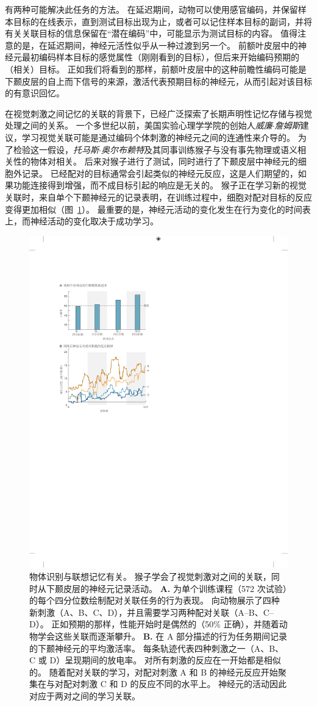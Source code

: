 有两种可能解决此任务的方法。
在延迟期间，动物可以使用感官编码，并保留样本目标的在线表示，直到测试目标出现为止，或者可以记住样本目标的副词，并将有关关联目标的信息保留在“潜在编码”中，可能显示为测试目标的内容。
值得注意的是，在延迟期间，神经元活性似乎从一种过渡到另一个。
前额叶皮层中的神经元最初编码样本目标的感觉属性（刚刚看到的目标），但后来开始编码预期的（相关）目标。
正如我们将看到的那样，前额叶皮层中的这种前瞻性编码可能是下颞皮层的自上而下信号的来源，激活代表预期目标的神经元，从而引起对该目标的有意识回忆。


在视觉刺激之间记忆的关联的背景下，已经广泛探索了长期声明性记忆存储与视觉处理之间的关系。
一个多世纪以前，美国实验心理学学院的创始人\textit{威廉$\cdot$詹姆斯}建议，学习视觉关联可能是通过编码个体刺激的神经元之间的连通性来介导的。
为了检验这一假设，\textit{托马斯$\cdot$奥尔布赖特}及其同事训练猴子与没有事先物理或语义相关性的物体对相关。
后来对猴子进行了测试，同时进行了下颞皮层中神经元的细胞外记录。
已经配对的目标通常会引起类似的神经元反应，这是人们期望的，如果功能连接得到增强，而不成目标引起的响应是无关的。
猴子正在学习新的视觉关联时，来自单个下颞神经元的记录表明，在训练过程中，细胞对配对目标的反应变得更加相似（图~\ref{fig:24_12}）。
最重要的是，神经元活动的变化发生在行为变化的时间表上，而神经活动的变化取决于成功学习。


\begin{figure}[htbp]
	\centering
	\includegraphics[width=0.65\linewidth]{chap24/fig_24_12}
	\caption{物体识别与联想记忆有关。
		猴子学会了视觉刺激对之间的关联，同时从下颞皮层的神经元记录活动。
		\textbf{A.} 为单个训练课程（572 次试验）的每个四分位数绘制配对关联任务的行为表现。
		向动物展示了四种新刺激（A、B、C、D），并且需要学习两种配对关联（A–B、C–D）。
		正如预期的那样，性能开始时是偶然的（50\% 正确），并随着动物学会这些关联而逐渐攀升。
		\textbf{B.} 在 A 部分描述的行为任务期间记录的下颞神经元的平均激活率。
		每条轨迹代表四种刺激之一（A、B、C 或 D）呈现期间的放电率。
		对所有刺激的反应在一开始都是相似的。
		随着配对关联的学习，对配对刺激 A 和 B 的神经元反应开始聚集在与对配对刺激 C 和 D 的反应不同的水平上。
		神经元的活动因此对应于两对之间的学习关联。}
	\label{fig:24_12}
\end{figure}


